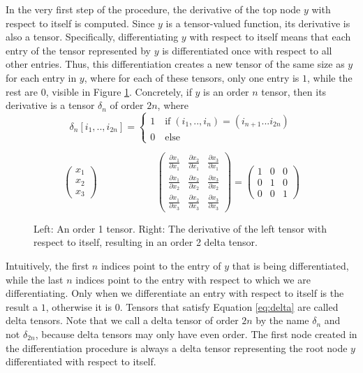 \documentclass[12pt, a4paper]{report}
\begin{document}
In the very first step of the procedure, the derivative of the top node $y$ with respect to itself is computed.
Since $y$ is a tensor-valued function, its derivative is also a tensor.
Specifically, differentiating $y$ with respect to itself means that each entry of the tensor represented by $y$ is differentiated once with respect to all other entries.
Thus, this differentiation creates a new tensor of the same size as $y$ for each entry in $y$, where for each of these tensors, only one entry is $1$, while the rest are $0$, visible in Figure \ref{fig:delta}.
Concretely, if $y$ is an order $n$ tensor, then its derivative is a tensor $\delta_n$ of order $2n$, where
\begin{equation}
    \delta_n[i_1,..,i_{2n}] = 
    \begin{cases}
        1 \quad \text{if} \; (i_1,..,i_n) = (i_{n+1}...i_{2n}) \\
        0 \quad \text{else}
    \end{cases}
    \label{eq:delta}
\end{equation}
\begin{figure}
    $$
    \begin{pmatrix}
        x_1\\
        x_2\\
        x_3
    \end{pmatrix} \quad \quad \quad \quad \quad \quad
    \begin{pmatrix}
        \frac{\partial x_1}{\partial x_1} & \frac{\partial x_2}{\partial x_1} & \frac{\partial x_3}{\partial x_1} \\
        \frac{\partial x_1}{\partial x_2} & \frac{\partial x_2}{\partial x_2} & \frac{\partial x_3}{\partial x_2} \\
        \frac{\partial x_1}{\partial x_3} & \frac{\partial x_2}{\partial x_3} & \frac{\partial x_3}{\partial x_3}
    \end{pmatrix}
    =
    \begin{pmatrix}
        1 & 0 & 0 \\
        0 & 1 & 0 \\
        0 & 0 & 1
    \end{pmatrix}
    $$
    \caption{Left: An order 1 tensor. Right: The derivative of the left tensor with respect to itself, resulting in an order 2 delta tensor.}
    \label{fig:delta}
\end{figure}
Intuitively, the first $n$ indices point to the entry of $y$ that is being differentiated, while the last $n$ indices point to the entry with respect to which we are differentiating.
Only when we differentiate an entry with respect to itself is the result a $1$, otherwise it is $0$.
Tensors that satisfy Equation \ref{eq:delta} are called delta tensors.
Note that we call a delta tensor of order $2n$ by the name $\delta_n$ and not $\delta_{2n}$, because delta tensors may only have even order.
The first node created in the differentiation procedure is always a delta tensor representing the root node $y$ differentiated with respect to itself.
\end{document}
